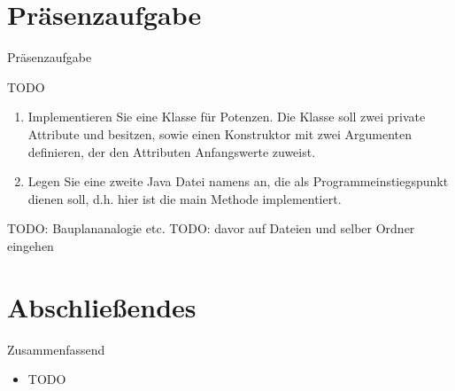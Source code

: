 \section{Präsenzaufgabe}
\begin{frame}[fragile,c]{Präsenzaufgabe}
\begin{aufgabe}{TODO}
\begin{enumerate}
    \item<2-> Implementieren Sie eine Klasse für Potenzen. Die Klasse soll zwei private Attribute  und  besitzen,
    sowie einen Konstruktor mit zwei Argumenten definieren, der den Attributen Anfangswerte zuweist. 
    \item<4-> Legen Sie eine zweite Java Datei namens  an, die als Programmeinstiegspunkt dienen soll, d.h. hier ist die main Methode implementiert. 
\end{enumerate}
\end{aufgabe}
\end{frame}

\begin{frame}{TODO:}
    Bauplananalogie etc.
    TODO: davor auf Dateien und selber Ordner eingehen
\end{frame}
\section{Abschließendes}
{\SummaryFrame
\begin{frame}[t]{Zusammenfassend}
\pause \printBibCommand
\vfill\vfill %
\begin{itemize}[<+(1)->]
    \itemsep6.5pt
    \item TODO
\end{itemize}
\end{frame}
}



\iffull\fi
